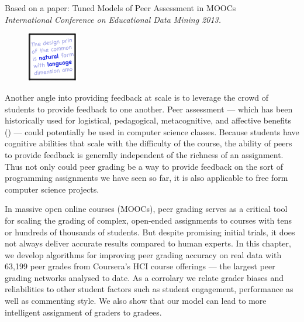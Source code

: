 
Based on a paper: Tuned Models of Peer Assessment in MOOCs \cite{piech2013tuned}\\ \emph{International Conference on Educational Data Mining 2013.}

\vspace{7mm}

\begin{figure}[h!]
\includegraphics[width=0.2\textwidth]{img/assnType_5}
\end{figure}

\vspace{7mm}

Another angle into providing feedback at scale is to leverage the crowd of students to provide feedback to one another. Peer assessment --- which has been historically used 
for logistical, pedagogical, metacognitive, and affective benefits (\cite{sadler06})
 --- 
could potentially be used in computer science classes. Because students have cognitive abilities that scale with the difficulty of the course, the ability of peers to provide feedback is generally independent of the richness of an assignment. Thus not only could peer grading be a way to provide feedback on the sort of programming assignments we have seen so far, it is also applicable to free form computer science projects.

In massive open online courses (MOOCs), peer grading serves as a critical tool for scaling the grading of complex, open-ended assignments to courses with tens or hundreds of thousands of students. But despite promising initial trials, it does not always deliver accurate results compared to human experts. In this chapter, we develop algorithms for improving peer grading accuracy on real data with 63,199 peer grades from Coursera's HCI course offerings --- the largest peer grading networks analysed to date. As a corrolary we relate grader biases and reliabilities to other student factors such as student engagement, performance as well as commenting style. We also show that our model can lead to more intelligent assignment of graders to gradees.

